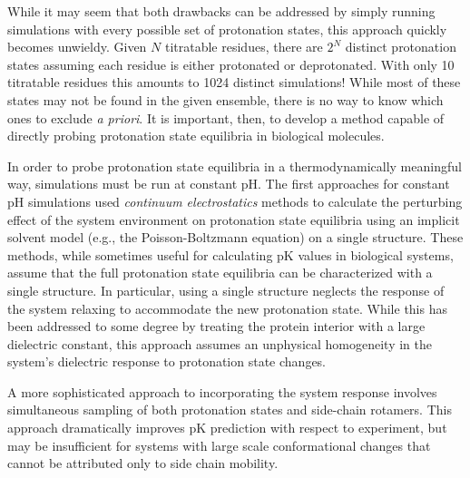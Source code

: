 While it may seem that both drawbacks can be addressed by simply running
simulations with every possible set of protonation states, this approach quickly
becomes unwieldy.  Given $N$ titratable residues, there are $2^N$ distinct
protonation states assuming each residue is either protonated or deprotonated.
With only 10 titratable residues this amounts to 1024 distinct simulations!
While most of these states may not be found in the given ensemble, there is no
way to know which ones to exclude \emph{a priori}.  It is important, then, to
develop a method capable of directly probing protonation state equilibria in
biological molecules.

In order to probe protonation state equilibria in a thermodynamically meaningful
way, simulations must be run at constant pH.  The first approaches for constant
pH simulations used \emph{continuum electrostatics} methods to calculate the
perturbing effect of the system environment on protonation state equilibria
using an implicit solvent model (e.g., the Poisson-Boltzmann equation) on a
single structure.  \cite{Bashford1990,Bashford1992,Antosiewicz1994}  These
methods, while sometimes useful for calculating pK values in biological
systems, assume that the full protonation state equilibria can be characterized
with a single structure.  In particular, using a single structure neglects the
response of the system relaxing to accommodate the new protonation state.  While
this has been addressed to some degree by treating the protein interior with a
large dielectric constant, \cite{Antosiewicz1994} this approach assumes an
unphysical homogeneity in the system's dielectric response to protonation state
changes.

A more sophisticated approach to incorporating the system response involves
simultaneous sampling of both protonation states and side-chain rotamers.
\cite{Song2009}  This approach dramatically improves pK prediction with
respect to experiment, but may be insufficient for systems with large scale
conformational changes that cannot be attributed only to side chain mobility.


